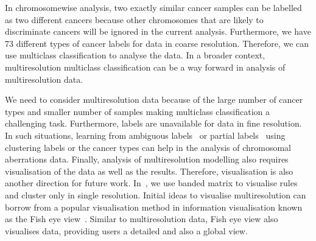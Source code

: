 In chromosomewise analysis, two exactly similar cancer samples
can be labelled as two different cancers because other chromosomes
that are likely to discriminate cancers will be ignored in the 
current analysis. Furthermore, we have 73 different types  of 
cancer labels for data in coarse resolution. Therefore, we can 
use multiclass classification to analyse the data. In a broader 
context, multiresolution multiclass classification can be a way
forward in analysis of multiresolution data. 

We need  to consider multiresolution  data because of the large  
number of cancer types and smaller number of samples making 
multiclass classification a challenging task.
Furthermore, labels are unavailable for data in fine resolution.
In such situations, learning from ambiguous labels~\cite{hullermeier2006} 
or partial labels~\cite{cour2011} using clustering labels or the 
cancer types can help in the analysis of chromosomal
aberrations data. Finally, analysis of multiresolution 
modelling also requires visualisation of the data as 
well as the results. Therefore, visualisation is also 
another direction for future work. In~, we use banded 
matrix to visualise rules and cluster only in single resolution. 
Initial ideas to visualise multiresolution can borrow from a 
popular visualisation method in information 
visualisation known as the Fish eye view~\cite{furnas86}.
Similar to multiresolution data, Fish eye view also visualises
data, providing users a detailed and also a global view.


